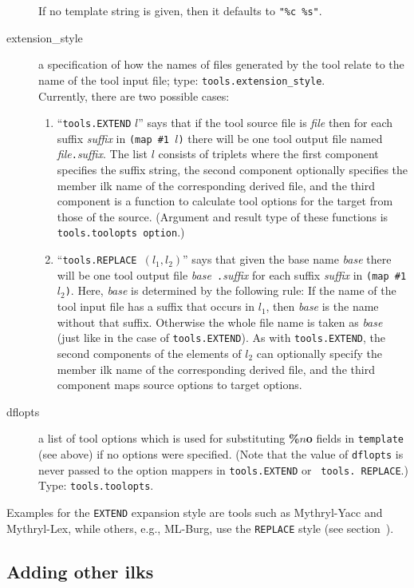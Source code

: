 \begin{description}
If no template string is given, then it defaults to {\tt "\%c \%s"}.
\item[extension_style] a specification of how the names of files
generated by the tool relate to the name of the tool input file;
type: {\tt tools.extension_style}. \\
Currently, there are two possible cases:
\begin{enumerate}
\item ``{\tt tools.EXTEND} $l$'' says that if the tool source file is
{\it file} then for each suffix {\it suffix} in {\tt (map \#1 $l$)} there
will be one tool output file named {\it file}{\tt .}{\it suffix}.  The
list $l$ consists of triplets where the first component specifies the
suffix string, the second component optionally specifies the
member ilk name of the corresponding derived file, and the
third component is a function to calculate tool options for the 
target from those of the source. (Argument and result type of these
functions is {\tt tools.toolopts option}.)
\item ``{\tt tools.REPLACE }$(l_1, l_2)$'' says that given the
base name {\it base} there will be one tool output file {\it base}{\tt
.}{\it suffix} for each suffix {\it suffix} in {\tt (map \#1 $l_2$)}.  Here,
{\it base} is determined by the following rule: If the name of the
tool input file has a suffix that occurs in $l_1$, then {\it base} is
the name without that suffix.  Otherwise the whole file name is taken
as {\it base} (just like in the case of {\tt tools.EXTEND}).  As with
{\tt tools.EXTEND}, the second components of the elements of $l_2$ can
optionally specify the member ilk name of the corresponding derived
file, and the third component maps source options to target options.
\end{enumerate}
\item[dflopts] a list of tool options which is used for
substituting {\bf \%$n$o} fields in {\tt template} (see above) if no
options were specified.  (Note that the value of {\tt dflopts} is never
passed to the option mappers in {\tt tools.EXTEND} or {\tt
tools. REPLACE}.)  Type: {\tt tools.toolopts}.
\end{description}

Examples for the {\tt EXTEND} expansion style are tools such as
Mythryl-Yacc and Mythryl-Lex, while others, e.g., ML-Burg, use the {\tt REPLACE}
style (see section~).

\subsection{Adding other ilks}


